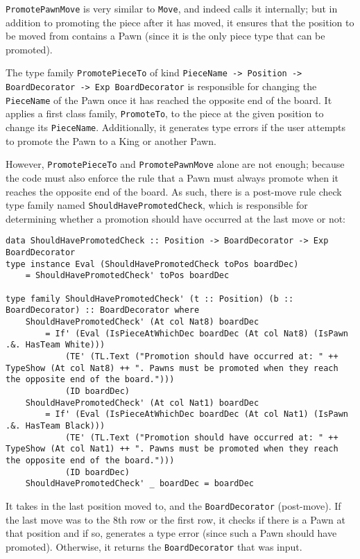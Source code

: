 \documentclass[12pt, a4paper, bibliography=totocnumbered]{scrreprt}
\newcommand{\inline}[1]{\lstinline[basicstyle=\ttfamily\footnotesize]{#1}}
\begin{document}
\inline{PromotePawnMove} is very similar to \inline{Move}, and indeed calls it internally; but in addition to promoting the piece after it has moved, it ensures that the position to be moved from contains a Pawn (since it is the only piece type that can be promoted).

The type family \inline{PromotePieceTo} of kind \inline{PieceName -> Position -> BoardDecorator -> Exp BoardDecorator} is responsible for changing the \inline{PieceName} of the Pawn once it has reached the opposite end of the board. It applies a first class family, \inline{PromoteTo}, to the piece at the given position to change its \inline{PieceName}. Additionally, it generates type errors if the user attempts to promote the Pawn to a King or another Pawn.

However, \inline{PromotePieceTo} and \inline{PromotePawnMove} alone are not enough; because the code must also enforce the rule that a Pawn must always promote when it reaches the opposite end of the board. As such, there is a post-move rule check type family named \inline{ShouldHavePromotedCheck}, which is responsible for determining whether a promotion should have occurred at the last move or not:

\begin{lstlisting}
data ShouldHavePromotedCheck :: Position -> BoardDecorator -> Exp BoardDecorator
type instance Eval (ShouldHavePromotedCheck toPos boardDec)
    = ShouldHavePromotedCheck' toPos boardDec

type family ShouldHavePromotedCheck' (t :: Position) (b :: BoardDecorator) :: BoardDecorator where
    ShouldHavePromotedCheck' (At col Nat8) boardDec
        = If' (Eval (IsPieceAtWhichDec boardDec (At col Nat8) (IsPawn .&. HasTeam White)))
            (TE' (TL.Text ("Promotion should have occurred at: " ++ TypeShow (At col Nat8) ++ ". Pawns must be promoted when they reach the opposite end of the board.")))
            (ID boardDec)
    ShouldHavePromotedCheck' (At col Nat1) boardDec
        = If' (Eval (IsPieceAtWhichDec boardDec (At col Nat1) (IsPawn .&. HasTeam Black)))
            (TE' (TL.Text ("Promotion should have occurred at: " ++ TypeShow (At col Nat1) ++ ". Pawns must be promoted when they reach the opposite end of the board.")))
            (ID boardDec)
    ShouldHavePromotedCheck' _ boardDec = boardDec
\end{lstlisting}

It takes in the last position moved to, and the \inline{BoardDecorator} (post-move).  If the last move was to the 8th row or the first row, it checks if there is a Pawn at that position and if so, generates a type error (since such a Pawn should have promoted). Otherwise, it returns the \inline{BoardDecorator} that was input.
\end{document}
